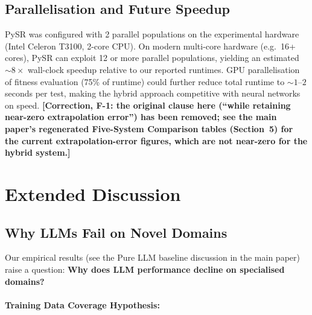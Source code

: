 \documentclass[twoside,11pt]{article}
\begin{document}
\subsection{Parallelisation and Future Speedup}

PySR was configured with 2 parallel populations on the experimental hardware (Intel Celeron T3100, 2-core CPU). On modern multi-core hardware (e.g.\ 16+ cores), PySR can exploit 12 or more parallel populations, yielding an estimated ${\sim}8\times$ wall-clock speedup relative to our reported runtimes. GPU parallelisation of fitness evaluation (75\% of runtime) could further reduce total runtime to ${\sim}1$--$2$ seconds per test, making the hybrid approach competitive with neural networks on speed. \textbf{[Correction, F-1: the original clause here (``while retaining near-zero extrapolation error'') has been removed; see the main paper's regenerated Five-System Comparison tables (Section~5) for the current extrapolation-error figures, which are not near-zero for the hybrid system.]}




\section{Extended Discussion}
\label{app:extended_discussion}

\subsection{Why LLMs Fail on Novel Domains}

Our empirical results (see the Pure LLM baseline discussion in the main paper) raise a question: \textbf{Why does LLM performance decline on specialised domains?}\citep{kambhampati2024llms}

\paragraph{Training Data Coverage Hypothesis:}
\end{document}
